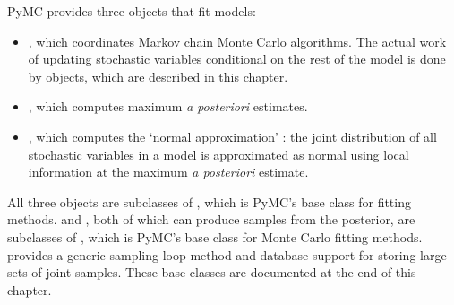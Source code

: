 
PyMC provides three objects that fit models:
\begin{itemize}
    \item {}, which coordinates Markov chain Monte Carlo algorithms. The actual work of updating stochastic variables conditional on the rest of the model is done by  objects, which are described in this chapter.
    \item {}, which computes maximum \emph{a posteriori} estimates.
    \item {}, which computes the `normal approximation' \citep{gelman}: the joint distribution of all stochastic variables in a model is approximated as normal using local information at the maximum \emph{a posteriori} estimate.
\end{itemize}

All three objects are subclasses of , which is PyMC's base class for fitting methods.  and , both of which can produce samples from the posterior, are subclasses of , which is PyMC's base class for Monte Carlo fitting methods.  provides a generic sampling loop method and database support for storing large sets of joint samples. These base classes are documented at the end of this chapter. %


